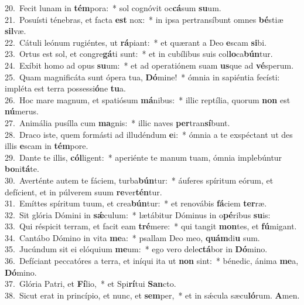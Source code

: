 {20.~}Fecit lunam in \textbf{tém}pora:~* sol cognóvit oc\textbf{cá}sum \textbf{su}um.\\
{21.~}Posuísti ténebras, et facta \textbf{est} nox:~* in ipsa pertransíbunt omnes \textbf{bé}stiæ \textbf{sil}væ.\\
{22.~}Cátuli leónum rugiéntes, ut \textbf{rá}piant:~* et quærant a Deo \textbf{e}scam \textbf{si}bi.\\
{23.~}Ortus est sol, et congre\textbf{gá}ti sunt:~* et in cubílibus suis col\textbf{lo}ca\textbf{bún}tur.\\
{24.~}Exíbit homo ad opus \textbf{su}um:~* et ad operatiónem suam \textbf{us}que ad \textbf{vé}sperum.\\
{25.~}Quam magnificáta sunt ópera tua, \textbf{Dó}mine!~* ómnia in sapiéntia fecísti: impléta est terra possessi\textbf{ó}ne \textbf{tu}a.\\
{26.~}Hoc mare magnum, et spatiósum \textbf{má}nibus:~* illic reptília, quorum \textbf{non} est \textbf{nú}merus.\\
{27.~}Animália pusílla cum \textbf{ma}gnis:~* illic naves \textbf{per}tran\textbf{sí}bunt.\\
{28.~}Draco iste, quem formásti ad illudéndum \textbf{e}i:~* ómnia a te exspéctant ut des illis \textbf{e}scam in \textbf{tém}pore.\\
{29.~}Dante te illis, \textbf{cól}ligent:~* aperiénte te manum tuam, ómnia implebúntur \textbf{bo}ni\textbf{tá}te.\\
{30.~}Averténte autem te fáciem, turba\textbf{bún}tur:~* áuferes spíritum eórum, et defícient, et in púlverem suum \textbf{re}ver\textbf{tén}tur.\\
{31.~}Emíttes spíritum tuum, et crea\textbf{bún}tur:~* et renovábis \textbf{fá}ciem \textbf{ter}ræ.\\
{32.~}Sit glória Dómini in \textbf{sǽ}culum:~* lætábitur Dóminus in o\textbf{pé}ribus \textbf{su}is:\\
{33.~}Qui réspicit terram, et facit eam \textbf{tré}mere:~* qui tangit \textbf{mon}tes, et \textbf{fú}migant.\\
{34.~}Cantábo Dómino in vita \textbf{me}a:~* psallam Deo meo, \textbf{quám}di\textbf{u} sum.\\
{35.~}Jucúndum sit ei elóquium \textbf{me}um:~* ego vero dele\textbf{ctá}bor in \textbf{Dó}mino.\\
{36.~}Defíciant peccatóres a terra, et iníqui ita ut \textbf{non} sint:~* bénedic, ánima \textbf{me}a, \textbf{Dó}mino.\\
{37.~}Glória Patri, et \textbf{Fí}lio,~* et Spi\textbf{rí}tui \textbf{San}cto.\\
{38.~}Sicut erat in princípio, et nunc, et \textbf{sem}per,~* et in sǽcula sæcu\textbf{ló}rum. \textbf{A}men.\\

